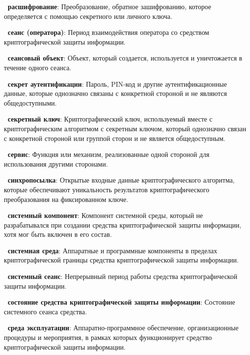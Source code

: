 {\bf \thedefctr~расшифрование}:
Преобразование, обратное зашифрованию, которое определяется с помощью
секретного или личного ключа.

{\bf \thedefctr~сеанс (оператора)}:
Период взаимодействия оператора со средством криптографической
защиты информации.

{\bf \thedefctr~сеансовый объект}:
Объект, который создается, 
используется и уничтожается в течение одного сеанса.

{\bf \thedefctr~секрет аутентификации}:
Пароль, PIN-код и другие аутентификационные данные, которые однозначно связаны с
конкретной стороной и не являются общедоступными.

{\bf \thedefctr~секретный ключ}:
Криптографический ключ, используемый вместе с криптографическим алгоритмом с
секретным ключом, который однозначно связан с конкретной стороной или группой
сторон и не является общедоступным.


{\bf \thedefctr~сервис}:
Функция или механизм, реализованные одной стороной для использования другими 
сторонами.

%

{\bf \thedefctr~синхропосылка}:
Открытые входные данные криптографического алгоритма,
которые обеспечивают уникальность результатов 
криптографического преобразования на фиксированном ключе.

{\bf \thedefctr~системный компонент}:
Компонент системной среды, который не разрабатывался при создании средства
криптографической защиты информации, хотя мог быть включен в его состав.

{\bf \thedefctr~системная среда}:
Аппаратные и программные компоненты в пределах криптографической границы
средства криптографической защиты информации.

{\bf \thedefctr~системный сеанс}:
Непрерывный период работы средства криптографической защиты информации.

{\bf \thedefctr~состояние средства криптографической защиты информации}:
Состояние системного сеанса средства.

{\bf \thedefctr~среда эксплуатации}:
Аппаратно-программное обеспечение, организационные процедуры и мероприятия,
в рамках которых функционирует средство криптографической защиты информации.

